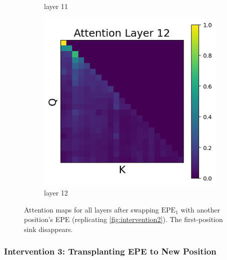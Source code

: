 \documentclass[11pt]{article}
\begin{document}
\begin{figure}[t]
\begin{subfigure}[t]{0.24\textwidth}
    \caption{layer 11}
  \end{subfigure}\hfill
  \begin{subfigure}[t]{0.24\textwidth}
    \centering
    \includegraphics[width=1.4\columnwidth]{figures/intervention2/layer_12.png}
    \caption{layer 12}
  \end{subfigure}\hfill

  \caption{Attention maps for all layers after swapping $\mathrm{EPE}_1$ with another position's EPE (replicating \cref{fig:intervention2}). The first-position sink disappears.}
\end{figure}

\subsubsection{Intervention 3: Transplanting EPE to New Position}\label{app:intervention3}
\end{document}
